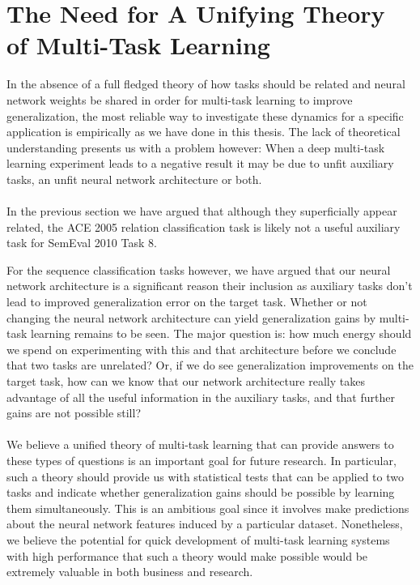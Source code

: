 \section{The Need for A Unifying Theory of Multi-Task Learning}
In the absence of a full fledged theory of how tasks should be related and neural network weights be shared in order for multi-task learning to improve generalization, the most reliable way to investigate these dynamics for a specific application is empirically as we have done in this thesis. The lack of theoretical understanding presents us with a problem however: When a deep multi-task learning experiment leads to a negative result it may be due to unfit auxiliary tasks, an unfit neural network architecture or both.
\\\\
In the previous section we have argued that although they superficially appear related, the ACE 2005 relation classification task is likely not a useful auxiliary task for SemEval 2010 Task 8.

For the sequence classification tasks however, we have argued that our neural network architecture is a significant reason their inclusion as auxiliary tasks don't lead to improved generalization error on the target task. Whether or not changing the neural network architecture can yield generalization gains by multi-task learning remains to be seen. The major question is: how much energy should we spend on experimenting with this and that architecture before we conclude that two tasks are unrelated? Or, if we do see generalization improvements on the target task, how can we know that our network architecture really takes advantage of all the useful information in the auxiliary tasks, and that further gains are not possible still?
\\\\
We believe a unified theory of multi-task learning that can provide answers to these types of questions is an important goal for future research. In particular, such a theory should provide us with statistical tests that can be applied to two tasks and indicate whether generalization gains should be possible by learning them simultaneously. This is an ambitious goal since it involves make predictions about the neural network features induced by a particular dataset. Nonetheless, we believe the potential for quick development of multi-task learning systems with high performance that such a theory would make possible would be extremely valuable in both business and research.

